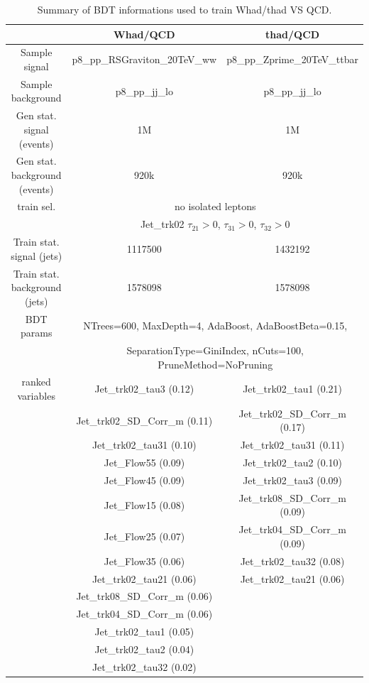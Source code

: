 \documentclass{cernrep}
\begin{document}
\begin{table}[!htb]\centering
\begin{tabular}{|c|c|c|}
\hline
\hline			
 & Whad/QCD & thad/QCD \\
\hline                        
\hline                        
Sample signal     & p8\_pp\_RSGraviton\_20TeV\_ww & p8\_pp\_Zprime\_20TeV\_ttbar \\
Sample background & p8\_pp\_jj\_lo                & p8\_pp\_jj\_lo               \\
\hline      
Gen stat. signal (events)     & 1M   & 1M   \\
Gen stat. background (events) & 920k & 920k \\
\hline
train sel. &  \multicolumn{2}{c|}{no isolated leptons} \\
           &  \multicolumn{2}{c|}{Jet\_trk02 $\tau_{21}>0$, $\tau_{31}>0$, $\tau_{32}>0$} \\
\hline
Train stat. signal (jets)     & 1117500 & 1432192 \\
Train stat. background (jets) & 1578098 & 1578098 \\
\hline
BDT params  &  \multicolumn{2}{c|}{NTrees=600, MaxDepth=4, AdaBoost, AdaBoostBeta=0.15,} \\
            &  \multicolumn{2}{c|}{SeparationType=GiniIndex, nCuts=100, PruneMethod=NoPruning} \\
\hline
ranked variables & Jet\_trk02\_tau3 (0.12)        & Jet\_trk02\_tau1 (0.21) \\
                 & Jet\_trk02\_SD\_Corr\_m (0.11) & Jet\_trk02\_SD\_Corr\_m (0.17) \\
                 & Jet\_trk02\_tau31 (0.10)       & Jet\_trk02\_tau31 (0.11) \\
                 & Jet\_Flow55 (0.09)             & Jet\_trk02\_tau2 (0.10) \\
                 & Jet\_Flow45 (0.09)             & Jet\_trk02\_tau3 (0.09) \\
                 & Jet\_Flow15 (0.08)             & Jet\_trk08\_SD\_Corr\_m (0.09) \\
                 & Jet\_Flow25 (0.07)             & Jet\_trk04\_SD\_Corr\_m (0.09) \\
                 & Jet\_Flow35 (0.06)             & Jet\_trk02\_tau32 (0.08) \\
                 & Jet\_trk02\_tau21 (0.06)       & Jet\_trk02\_tau21 (0.06) \\
                 & Jet\_trk08\_SD\_Corr\_m (0.06) &  \\
                 & Jet\_trk04\_SD\_Corr\_m (0.06) &  \\
                 & Jet\_trk02\_tau1 (0.05)        &  \\
                 & Jet\_trk02\_tau2 (0.04)        &  \\
                 & Jet\_trk02\_tau32 (0.02)       &  \\
\hline
\hline
\end{tabular}
\caption{Summary of BDT informations used to train Whad/thad VS QCD.}
\label{tab:TMVA_summary}
\end{table}
\end{document}
